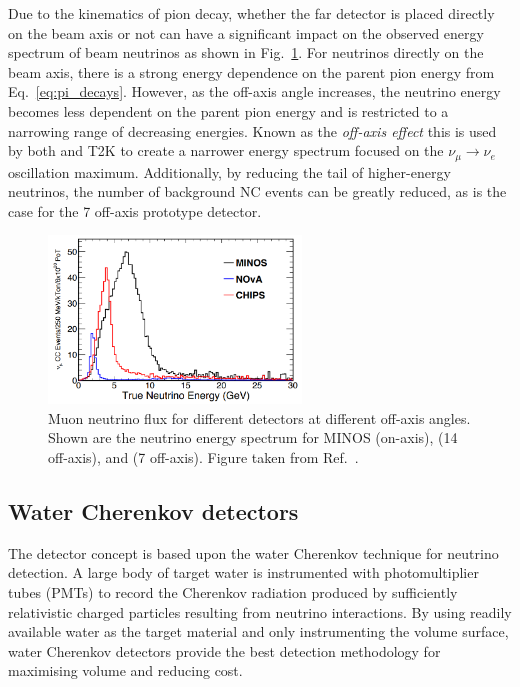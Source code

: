 Due to the kinematics of pion decay, whether the far detector is placed directly on the beam axis
or not can have a significant impact on the observed energy spectrum of beam neutrinos as shown in
Fig.~\ref{fig:numi_axis}. For neutrinos directly on the beam axis, there is a strong energy
dependence on the parent pion energy from Eq.~\ref{eq:pi_decays}. However, as the off-axis angle
increases, the neutrino energy becomes less dependent on the parent pion energy and is restricted
to a narrowing range of decreasing energies. Known as the \emph{off-axis effect} this is used by
both \nova and T2K to create a narrower energy spectrum focused on the
$\nu_{\mu}\rightarrow\nu_{e}$ oscillation maximum. Additionally, by reducing the tail of
higher-energy neutrinos, the number of background NC events can be greatly reduced, as is the case
for the \unit{7}{} off-axis \chipsfive prototype detector.

\begin{figure} %
    \includegraphics[width=0.6\textwidth]{diagrams/4-chips/numi_axis.png}
    \caption[Muon neutrino flux for different \numi detectors at different off-axis angles.]
    {Muon neutrino flux for different \numi detectors at different off-axis angles. Shown are the
        neutrino energy spectrum for MINOS (on-axis), \nova (\unit{14}{} off-axis),
        and \chipsfive (\unit{7}{} off-axis). Figure taken from
        Ref.~\cite{adamson2013}.}
    \label{fig:numi_axis}
\end{figure}

\subsection{Water Cherenkov detectors} %
\label{sec:chips_concept_cherenkov} %

The \chips detector concept is based upon the water Cherenkov technique for neutrino detection. A
large body of target water is instrumented with photomultiplier tubes (PMTs) to record the
Cherenkov radiation produced by sufficiently relativistic charged particles resulting from
neutrino interactions. By using readily available water as the target material and only
instrumenting the volume surface, water Cherenkov detectors provide the best detection methodology
for maximising volume and reducing cost.

